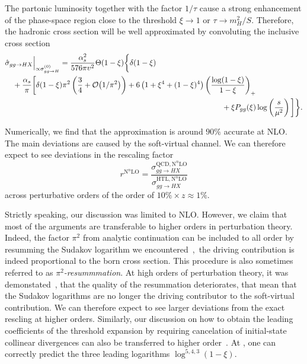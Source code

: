 The partonic luminosity together with the factor $1/\tau$ cause a strong enhancement of the phase-space region close to the threshold $\xi \rightarrow 1$ or $\tau \rightarrow m_H^2/S$. Therefore, the hadronic cross section will be well approximated by convoluting the inclusive cross section
\begin{equation}
\begin{split}
& \hat{\sigma}_{gg \rightarrow HX} \Big \vert_{\propto \sigma_{gg \rightarrow H}^{(0)}} = \frac{\alphas^2}{576 \pi v^2} \Theta(1 - \xi) \bigg \lbrace \delta(1 - \xi) \\
& \quad + \frac{\alphas}{\pi} \bigg [ \delta(1 - \xi) \pi^2\left( \frac{3}{4} + \BigO{1/\pi^2} \right) + 6 \left( 1 + \xi^4 + (1 - \xi)^4 \right) \left(\frac{\log (1 - \xi)}{1 - \xi} \right)_+ \\
& \hspace{10cm} + \xi P_{gg}(\xi) \log \left(\frac{s}{\mu^2} \right) \bigg ] \bigg \rbrace.
\end{split}
\end{equation}

Numerically, we find that the approximation is around $90\%$ accurate at \acs{NLO}. The main deviations are caused by the soft-virtual channel. We can therefore expect to see deviations in the rescaling factor
\begin{equation}
r^{\mathrm{N}^n\mathrm{LO}} = \frac{\sigma_{gg \rightarrow HX}^{\mathrm{QCD}, \mathrm{N}^n \mathrm{LO}}}{\sigma_{gg \rightarrow HX}^{\mathrm{HTL}, \mathrm{N}^n \mathrm{LO}}}
\end{equation}
across perturbative orders of the order of $10\%\times z \approx 1\%$.

Strictly speaking, our discussion was limited to \acs{NLO}. However, we claim that most of the arguments are transferable to higher orders in perturbation theory. Indeed, the factor $\pi^2$ from analytic continuation can be included to all order by resumming the Sudakov logarithm we encountered~\cite{Ahrens:2008qu},\ie\ the driving contribution is indeed proportional to the born cross section. This procedure is also sometimes referred to as $\pi^2$\textit{-resummmation}. At high orders of perturbation theory, it was demonstated~\cite{Anastasiou:2016cez}, that the quality of the resummation deteriorates, that mean that the Sudakov logarithms are no longer the driving contributor to the soft-virtual contribution. We can therefore expect to see larger deviations from the exact rescling at higher orders. Similarly, our discussion on how to obtain the leading coefficients of the threshold expansion by requiring cancelation of initial-state collinear divergences can also be transferred to higher order~\cite{Anastasiou:2014lda}. At \NNNLO, one can correctly predict the three leading logarithms $\log^{5,4,3}( 1 - \xi)$.

